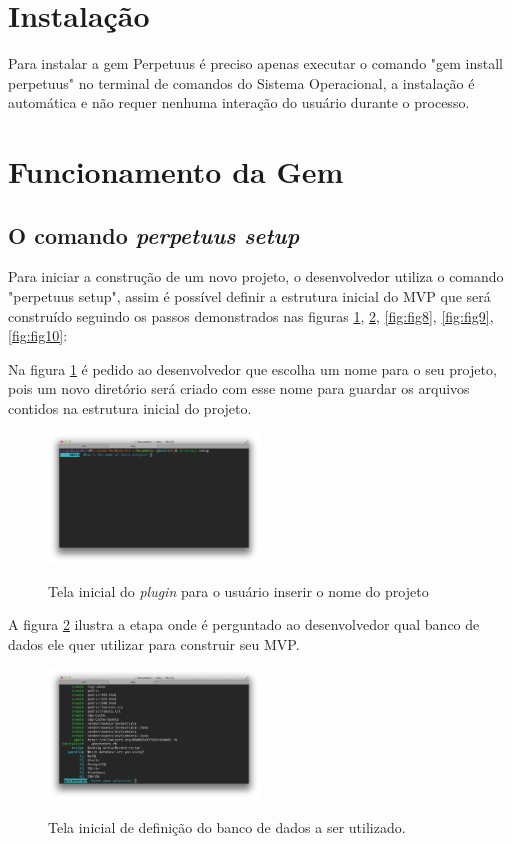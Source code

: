 \section{Instala\c{c}\~ao}

Para instalar a gem Perpetuus \'e preciso apenas executar o comando "gem install perpetuus" no terminal de comandos do Sistema Operacional, a instala\c{c}\~ao \'e autom\'atica e n\~ao requer nenhuma intera\c{c}\~ao do usu\'ario durante o processo.

\section{Funcionamento da Gem}

\subsection{O comando \emph{perpetuus setup}}

Para iniciar a constru\c{c}\~ao de um novo projeto, o desenvolvedor utiliza o comando "perpetuus setup", assim \'e poss\'ivel definir a estrutura inicial do MVP que ser\'a constru\'ido seguindo os passos demonstrados nas figuras \ref{fig:fig6}, \ref{fig:fig7}, \ref{fig:fig8}, \ref{fig:fig9}, \ref{fig:fig10}:

Na figura \ref{fig:fig6} \'e pedido ao desenvolvedor que escolha um nome para o seu projeto, pois um novo diret\'orio ser\'a criado com esse nome para guardar os arquivos contidos na estrutura inicial do projeto.

\begin{figure}[h]
  \centering
  \caption{Tela inicial do \emph{plugin} para o usu\'ario inserir o nome do projeto}
  \includegraphics[width=0.5\textwidth]{./fig/setup1}
  \label{fig:fig6}
\end{figure}

A figura \ref{fig:fig7} ilustra a etapa onde \'e perguntado ao desenvolvedor qual banco de dados ele quer utilizar para construir seu MVP.

\begin{figure}[h]
  \centering
  \caption{Tela inicial de defini\c{c}\~ao do banco de dados a ser utilizado.}
  \includegraphics[width=0.5\textwidth]{./fig/setup2}
  \label{fig:fig7}
\end{figure}

